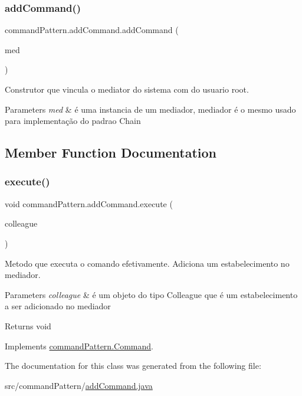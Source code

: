 \subsubsection{\texorpdfstring{addCommand()}{addCommand()}}
{\footnotesize\ttfamily command\+Pattern.\+add\+Command.\+add\+Command (\begin{DoxyParamCaption}\item[{\mbox{\hyperlink{classmediator_pattern_1_1_mediator_message}{Mediator\+Message}}}]{med }\end{DoxyParamCaption})}



Construtor que vincula o mediator do sistema com do usuario root. 


\begin{DoxyParams}{Parameters}
{\em med} & é uma instancia de um mediador, mediador é o mesmo usado para implementação do padrao Chain \\
\hline
\end{DoxyParams}


\subsection{Member Function Documentation}
\mbox{\label{classcommand_pattern_1_1add_command_a9d870d379fb2f882910b97ca19fe159c}} 
\subsubsection{\texorpdfstring{execute()}{execute()}}
{\footnotesize\ttfamily void command\+Pattern.\+add\+Command.\+execute (\begin{DoxyParamCaption}\item[{\mbox{\hyperlink{classmediator_pattern_1_1_colleague}{Colleague}}}]{colleague }\end{DoxyParamCaption})}



Metodo que executa o comando efetivamente. Adiciona um estabelecimento no mediador. 


\begin{DoxyParams}{Parameters}
{\em colleague} & é um objeto do tipo Colleague que é um estabelecimento a ser adicionado no mediador \\
\hline
\end{DoxyParams}
\begin{DoxyReturn}{Returns}
void 
\end{DoxyReturn}


Implements \mbox{\hyperlink{interfacecommand_pattern_1_1_command_a4e6eb0bcffccf0b3934ccd1d5727b39b}{command\+Pattern.\+Command}}.



The documentation for this class was generated from the following file\+:\begin{DoxyCompactItemize}
\item 
src/command\+Pattern/\mbox{\hyperlink{add_command_8java}{add\+Command.\+java}}\end{DoxyCompactItemize}
